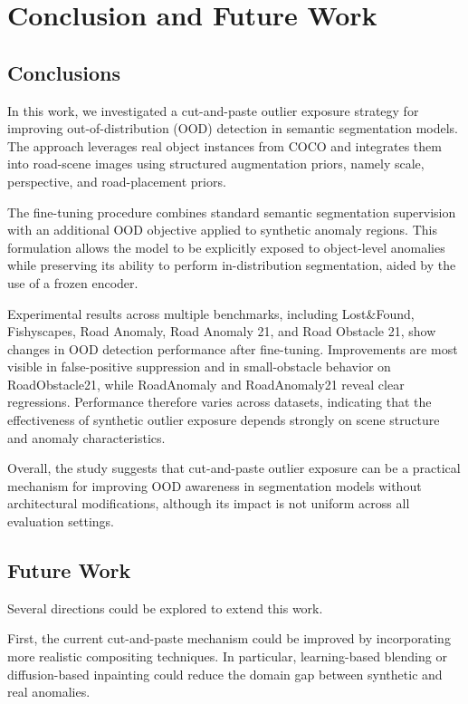 \section{Conclusion and Future Work}
\label{sec:conclusion}

\subsection{Conclusions}

In this work, we investigated a cut-and-paste outlier exposure strategy for improving out-of-distribution (OOD) detection in semantic segmentation models. The approach leverages real object instances from COCO and integrates them into road-scene images using structured augmentation priors, namely scale, perspective, and road-placement priors.

The fine-tuning procedure combines standard semantic segmentation supervision with an additional OOD objective applied to synthetic anomaly regions. This formulation allows the model to be explicitly exposed to object-level anomalies while preserving its ability to perform in-distribution segmentation, aided by the use of a frozen encoder.

Experimental results across multiple benchmarks, including Lost\&Found, Fishyscapes, Road Anomaly, Road Anomaly 21, and Road Obstacle 21, show changes in OOD detection performance after fine-tuning. Improvements are most visible in false-positive suppression and in small-obstacle behavior on RoadObstacle21, while RoadAnomaly and RoadAnomaly21 reveal clear regressions. Performance therefore varies across datasets, indicating that the effectiveness of synthetic outlier exposure depends strongly on scene structure and anomaly characteristics.

Overall, the study suggests that cut-and-paste outlier exposure can be a practical mechanism for improving OOD awareness in segmentation models without architectural modifications, although its impact is not uniform across all evaluation settings.

\subsection{Future Work}

Several directions could be explored to extend this work.

First, the current cut-and-paste mechanism could be improved by incorporating more realistic compositing techniques. In particular, learning-based blending or diffusion-based inpainting could reduce the domain gap between synthetic and real anomalies.

